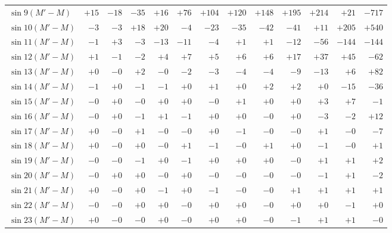 \begin{landscape}
\begin{longtable}{@{}l|r|r|r|r|r|r|r|r|r|r|r|r@{}}
\(\sin 9(M'-M)\) & \(+15\) & \(-18\) & \(-35\) & \(+16\) & \(+76\) & \(+104\) & \(+120\) & \(+148\) & \(+195\) & \(+214\) & \(+21\) & \(-717\)\\
\(\sin 10(M'-M)\) & \(-3\) & \(-3\) & \(+18\) & \(+20\) & \(-4\) & \(-23\) & \(-35\) & \(-42\) & \(-41\) & \(+11\) & \(+205\) & \(+540\)\\
\(\sin 11(M'-M)\) & \(-1\) & \(+3\) & \(-3\) & \(-13\) & \(-11\) & \(-4\) & \(+1\) & \(+1\) & \(-12\) & \(-56\) & \(-144\) & \(-144\)\\
\(\sin 12(M'-M)\) & \(+1\) & \(-1\) & \(-2\) & \(+4\) & \(+7\) & \(+5\) & \(+6\) & \(+6\) & \(+17\) & \(+37\) & \(+45\) & \(-62\)\\
\(\sin 13(M'-M)\) & \(+0\) & \(-0\) & \(+2\) & \(-0\) & \(-2\) & \(-3\) & \(-4\) & \(-4\) & \(-9\) & \(-13\) & \(+6\) & \(+82\)\\
\(\sin 14(M'-M)\) & \(-1\) & \(+0\) & \(-1\) & \(-1\) & \(+0\) & \(+1\) & \(+0\) & \(+2\) & \(+2\) & \(+0\) & \(-15\) & \(-36\)\\
\(\sin 15(M'-M)\) & \(-0\) & \(+0\) & \(-0\) & \(+0\) & \(+0\) & \(-0\) & \(+1\) & \(+0\) & \(+0\) & \(+3\) & \(+7\) & \(-1\)\\
\(\sin 16(M'-M)\) & \(-0\) & \(+0\) & \(-1\) & \(+1\) & \(-1\) & \(+0\) & \(+0\) & \(-0\) & \(+0\) & \(-3\) & \(-2\) & \(+12\)\\
\(\sin 17(M'-M)\) & \(+0\) & \(-0\) & \(+1\) & \(-0\) & \(-0\) & \(+0\) & \(-1\) & \(-0\) & \(-0\) & \(+1\) & \(-0\) & \(-7\)\\
\(\sin 18(M'-M)\) & \(+0\) & \(-0\) & \(+0\) & \(-0\) & \(+1\) & \(-1\) & \(-0\) & \(+1\) & \(+0\) & \(-1\) & \(-0\) & \(+1\)\\
\(\sin 19(M'-M)\) & \(-0\) & \(-0\) & \(-1\) & \(+0\) & \(-1\) & \(+0\) & \(+0\) & \(+0\) & \(-0\) & \(+1\) & \(+1\) & \(+2\)\\
\(\sin 20(M'-M)\) & \(-0\) & \(+0\) & \(+0\) & \(-0\) & \(+0\) & \(-0\) & \(-0\) & \(-0\) & \(-0\) & \(-1\) & \(+1\) & \(-2\)\\
\(\sin 21(M'-M)\) & \(+0\) & \(-0\) & \(+0\) & \(-1\) & \(+0\) & \(-1\) & \(-0\) & \(-0\) & \(+1\) & \(+1\) & \(+1\) & \(+1\)\\
\(\sin 22(M'-M)\) & \(-0\) & \(-0\) & \(+0\) & \(+0\) & \(-0\) & \(+0\) & \(+0\) & \(-0\) & \(+0\) & \(+0\) & \(-1\) & \(+0\)\\
\(\sin 23(M'-M)\) & \(+0\) & \(-0\) & \(-0\) & \(+0\) & \(-0\) & \(+0\) & \(+0\) & \(-0\) & \(-1\) & \(+1\) & \(+1\) & \(-0\)\\
\end{longtable}

\end{landscape}
